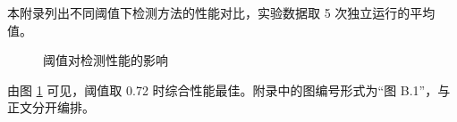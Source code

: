 
本附录列出不同阈值下检测方法的性能对比，实验数据取 5 次独立运行的平均值。

\begin{figure}[htbp]
  \centering
  \caption{阈值对检测性能的影响}
  \label{fig:appb-threshold}
\end{figure}

由图 \ref{fig:appb-threshold} 可见，阈值取 0.72 时综合性能最佳。附录中的图编号形式为“图 B.1”，与正文分开编排。
